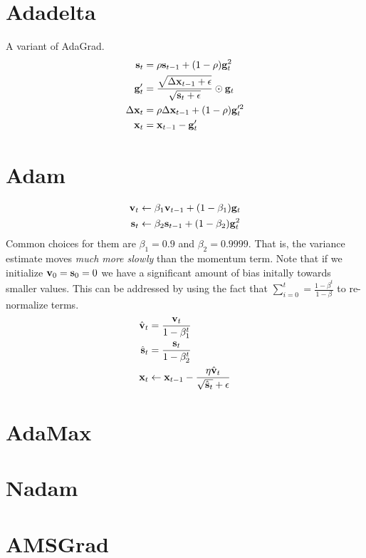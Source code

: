 \section{Adadelta}
A variant of AdaGrad.
\begin{equation}
    \begin{split}
        \mathbf{s}_t &= \rho \mathbf{s}_{t-1} + (1-\rho)\mathbf{g}^2_t \\
        \mathbf{g}'_t &= \frac{\sqrt{\Delta \mathbf{x}_{t-1} + \epsilon}}{\sqrt{\mathbf{s}_t + \epsilon}} \odot \mathbf{g}_t\\
        \Delta \mathbf{x}_t &= \rho \Delta \mathbf{x}_{t-1} + (1 - \rho)\mathbf{g}'^2_t\\
        \mathbf{x}_t &= \mathbf{x}_{t-1} - \mathbf{g}'_t
    \end{split}
\end{equation}

\section{Adam}
\begin{equation}
    \begin{split}
        \mathbf{v}_t &\leftarrow \beta_1 \mathbf{v}_{t-1} + (1-\beta_1)\mathbf{g}_t \\
        \mathbf{s}_t &\leftarrow \beta_2 \mathbf{s}_{t-1} + (1-\beta_2)\mathbf{g}^2_t
    \end{split}
\end{equation}
Common choices for them are $\beta_1 = 0.9$ and $\beta_2 = 0.9999$. That is, the variance estimate moves \textit{much more slowly}
than the momentum term. Note that if we initialize $\mathbf{v}_0 = \mathbf{s}_0 = 0$ we have a significant amount of bias initally
towards smaller values. This can be addressed by using the fact that $\sum_{i=0}^t = \frac{1-\beta^t}{1-\beta}$ to re-normalize terms.
\begin{equation}
    \begin{split}
        \hat{\mathbf{v}}_t &= \frac{\mathbf{v}_t}{1-\beta_1^t} \\
        \hat{\mathbf{s}}_t &= \frac{\mathbf{s}_t}{1-\beta_2^t} \\
        \mathbf{x}_t &\leftarrow \mathbf{x}_{t-1} - \frac{\eta \hat{\mathbf{v}}_t}{\sqrt{\hat{\mathbf{s}}_t} + \epsilon}
    \end{split}
\end{equation}

\section{AdaMax}
\section{Nadam}
\section{AMSGrad}

